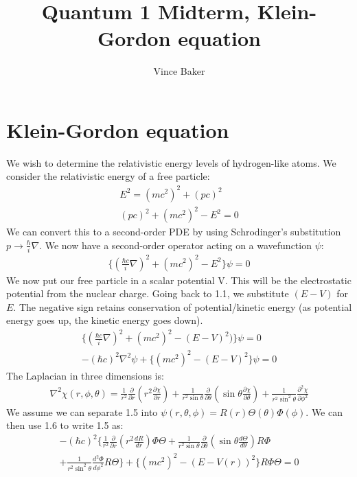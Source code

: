 \documentclass[a4paper,10pt]{article}
\title{Quantum 1 Midterm, Klein-Gordon equation}
\author{Vince Baker}
\numberwithin{equation}{section}
\begin{document}
\maketitle

\section{Klein-Gordon equation}
We wish to determine the relativistic energy levels of hydrogen-like atoms.
We consider the relativistic energy of a free particle:
\begin{gather}
 E^2=(mc^2)^2+(pc)^2\\
 (pc)^2+(mc^2)^2-E^2=0
\end{gather}
We can convert this to a second-order PDE by using Schrodinger's substitution $p\rightarrow\frac{\hbar}{i}\nabla$.
We now have a second-order operator acting on a wavefunction $\psi$:
\begin{gather}
\{(\frac{\hbar c}{i}\nabla)^2+(mc^2)^2-E^2\}\psi = 0
\end{gather}
We now put our free particle in a scalar potential V. 
This will be the electrostatic potential from the nuclear charge.
Going back to 1.1, we substitute $(E-V)$ for $E$.
The negative sign retains conservation of potential/kinetic energy (as potential energy goes up, the kinetic energy goes down).
\begin{gather}
 \{(\frac{\hbar c}{i}\nabla)^2+(mc^2)^2-(E-V)^2)\}\psi = 0\\
 -(\hbar c)^2\nabla ^2\psi+\{(mc^2)^2-(E-V)^2\}\psi=0
\end{gather}
The Laplacian in three dimensions is:
\begin{gather}
 \nabla^2\chi(r,\phi,\theta)=\frac{1}{r^2}\frac{\partial}{\partial r}(r^2\frac{\partial \chi}{\partial r})+\frac{1}{r^2\sin \theta}\frac{\partial}{\partial \theta}(\sin \theta \frac{\partial \chi}{\partial \theta} )
 +\frac{1}{r^2 \sin ^2 \theta}\frac{\partial ^2 \chi}{\partial \phi^2}
\end{gather}
We assume we can separate 1.5 into $\psi(r,\theta, \phi)=R(r)\Theta(\theta)\Phi(\phi)$. We can then use 1.6 to write 1.5 as:
\begin{multline}
  -(\hbar c)^2\{\frac{1}{r^2}\frac{\partial}{\partial r}(r^2\frac{dR}{dr})\Phi\Theta+\frac{1}{r^2\sin \theta}\frac{\partial}{\partial \theta}(\sin \theta \frac{d\Theta}{d \theta})R\Phi\\
 +\frac{1}{r^2 \sin ^2 \theta}\frac{d^2\Phi}{d \phi^2}R\Theta\}
 +\{(mc^2)^2-(E-V(r))^2\}R\Phi\Theta=0
\end{multline}
\end{document}
